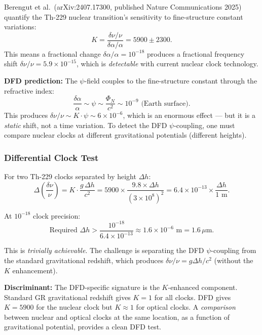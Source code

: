 \documentclass[11pt]{article}
\newcommand{\ee}[1]{\times 10^{#1}}
\begin{document}
Berengut et al.\ (arXiv:2407.17300, published Nature Communications
2025) quantify the Th-229 nuclear transition's sensitivity to
fine-structure constant variations:
\begin{equation}
  K = \frac{\delta\nu/\nu}{\delta\alpha/\alpha} = 5900 \pm 2300.
\end{equation}
This means a fractional change $\delta\alpha/\alpha = 10^{-18}$
produces a fractional frequency shift $\delta\nu/\nu = 5.9\ee{-15}$,
which is \emph{detectable} with current nuclear clock technology.

\textbf{DFD prediction:} The $\psi$-field couples to the
fine-structure constant through the refractive index:
\begin{equation}
  \frac{\delta\alpha}{\alpha} \sim \psi \sim \frac{\Phi_N}{c^2}
  \sim 10^{-9} \text{ (Earth surface)}.
\end{equation}
This produces $\delta\nu/\nu \sim K \cdot \psi \sim 6\ee{-6}$,
which is an enormous effect --- but it is a \emph{static} shift,
not a time variation. To detect the DFD $\psi$-coupling, one must
compare nuclear clocks at different gravitational potentials
(different heights).

\subsubsection{Differential Clock Test}

For two Th-229 clocks separated by height $\Delta h$:
\begin{equation}
  \Delta\!\left(\frac{\delta\nu}{\nu}\right)
  = K \cdot \frac{g\,\Delta h}{c^2}
  = 5900 \times \frac{9.8 \times \Delta h}{(3\ee{8})^2}
  = 6.4\ee{-13} \times \frac{\Delta h}{1\text{ m}}.
\end{equation}

At $10^{-18}$ clock precision:
\begin{equation}
  \text{Required } \Delta h > \frac{10^{-18}}{6.4\ee{-13}} \approx 1.6\ee{-6}\text{ m} = 1.6\,\mu\text{m}.
\end{equation}

This is \emph{trivially achievable}. The challenge is separating the
DFD $\psi$-coupling from the standard gravitational redshift, which
produces $\delta\nu/\nu = g\Delta h/c^2$ (without the $K$ enhancement).

\textbf{Discriminant:} The DFD-specific signature is the $K$-enhanced
component. Standard GR gravitational redshift gives $K = 1$ for all
clocks. DFD gives $K = 5900$ for the nuclear clock but $K \approx 1$
for optical clocks. A \emph{comparison} between nuclear and optical
clocks at the same location, as a function of gravitational potential,
provides a clean DFD test.
\end{document}
